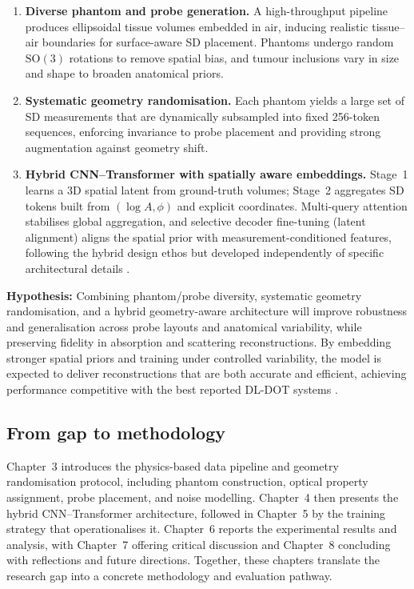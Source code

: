 \begin{enumerate}[leftmargin=*,label=\arabic*.]
    \item \textbf{Diverse phantom and probe generation.} A high-throughput pipeline produces ellipsoidal tissue volumes embedded in air, inducing realistic tissue–air boundaries for surface-aware SD placement. Phantoms undergo random $\mathrm{SO}(3)$ rotations to remove spatial bias, and tumour inclusions vary in size and shape to broaden anatomical priors.
    
    \item \textbf{Systematic geometry randomisation.} Each phantom yields a large set of SD measurements that are dynamically subsampled into fixed 256-token sequences, enforcing invariance to probe placement and providing strong augmentation against geometry shift.
    
    \item \textbf{Hybrid CNN–Transformer with spatially aware embeddings.} Stage~1 learns a 3D spatial latent from ground-truth volumes; Stage~2 aggregates SD tokens built from $(\log A,\phi)$ and explicit coordinates. Multi-query attention stabilises global aggregation, and selective decoder fine-tuning (latent alignment) aligns the spatial prior with measurement-conditioned features, following the hybrid design ethos but developed independently of specific architectural details \cite{dale2024,dale2025,dale2025thesis}.
\end{enumerate}

\noindent\textbf{Hypothesis:} Combining phantom/probe diversity, systematic geometry randomisation, and a hybrid geometry-aware architecture will improve robustness and generalisation across probe layouts and anatomical variability, while preserving fidelity in absorption and scattering reconstructions. By embedding stronger spatial priors and training under controlled variability, the model is expected to deliver reconstructions that are both accurate and efficient, achieving performance competitive with the best reported DL-DOT systems \cite{dale2024}.

\subsection{From gap to methodology}
Chapter~3 introduces the physics-based data pipeline and geometry randomisation protocol, including phantom construction, optical property assignment, probe placement, and noise modelling. Chapter~4 then presents the hybrid CNN–Transformer architecture, followed in Chapter~5 by the training strategy that operationalises it. Chapter~6 reports the experimental results and analysis, with Chapter~7 offering critical discussion and Chapter~8 concluding with reflections and future directions. Together, these chapters translate the research gap into a concrete methodology and evaluation pathway.

